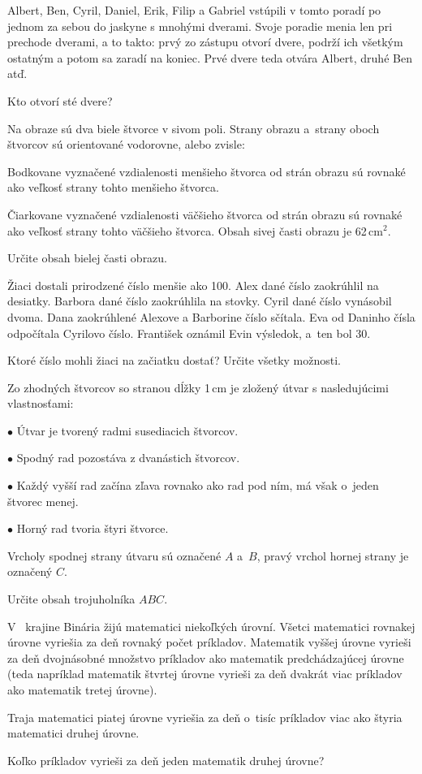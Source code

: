 {%
Albert, Ben, Cyril, Daniel, Erik, Filip a Gabriel vstúpili v tomto poradí po jednom za sebou do jaskyne s mnohými dverami.
Svoje poradie menia len pri prechode dverami, a to takto:
prvý zo zástupu otvorí dvere, podrží ich všetkým ostatným a potom sa zaradí na koniec.
Prvé dvere teda otvára Albert, druhé Ben atď.

Kto otvorí sté dvere?}

{%
Na obraze sú dva biele štvorce v sivom poli.
Strany obrazu a~strany oboch štvorcov sú orientované vodorovne, alebo zvisle:
%

Bodkovane vyznačené vzdialenosti menšieho štvorca od strán obrazu sú rovnaké ako veľkosť strany tohto menšieho štvorca.

Čiarkovane vyznačené vzdialenosti väčšieho štvorca od strán obrazu sú rovnaké ako veľkosť strany tohto väčšieho štvorca.
Obsah sivej časti obrazu je 62\,cm$^2$.

Určite obsah bielej časti obrazu.}

{%
Žiaci dostali prirodzené číslo menšie ako 100.
Alex dané číslo zaokrúhlil na desiatky.
Barbora dané číslo zaokrúhlila na stovky.
Cyril dané číslo vynásobil dvoma.
Dana zaokrúhlené Alexove a Barborine číslo sčítala.
Eva od Daninho čísla odpočítala Cyrilovo číslo.
František oznámil Evin výsledok, a~ten bol 30.

Ktoré číslo mohli žiaci na začiatku dostať?
Určite všetky možnosti.}

{%
Zo zhodných štvorcov so stranou dĺžky 1\,cm je zložený útvar s nasledujúcimi vlastnosťami:

\smallskip
\item{$\bullet$} Útvar je tvorený radmi susediacich štvorcov.
\item{$\bullet$} Spodný rad pozostáva z dvanástich štvorcov.
\item{$\bullet$} Každý vyšší rad začína zľava rovnako ako rad pod ním, má však o~jeden štvorec menej.
\item{$\bullet$} Horný rad tvoria štyri štvorce.

\smallskip\noindent
Vrcholy spodnej strany útvaru sú označené $A$ a~$B$, pravý vrchol hornej strany je označený $C$.

Určite obsah trojuholníka $ABC$.
%
}

{%
V ~krajine Binária žijú matematici niekoľkých úrovní.
Všetci matematici rovnakej úrovne vyriešia za deň rovnaký počet príkladov.
Matematik vyššej úrovne vyrieši za deň dvojnásobné množstvo príkladov ako matematik predchádzajúcej úrovne (teda napríklad matematik štvrtej úrovne vyrieši za deň dvakrát viac príkladov ako matematik tretej úrovne).

Traja matematici piatej úrovne vyriešia za deň o~tisíc príkladov viac ako štyria matematici druhej úrovne.

Koľko príkladov vyrieši za deň jeden matematik druhej úrovne?}

